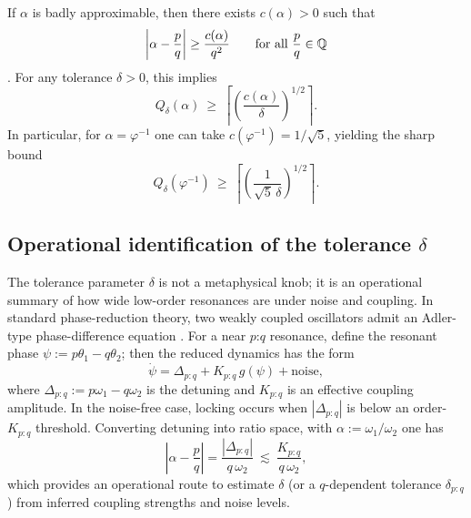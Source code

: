 \begin{proposition}
\label{prop:Qdelta_bound}
If $\alpha$ is badly approximable, then there exists $c(\alpha)>0$ such that
\begin{equation}
  \left|\alpha-\frac{p}{q}\right| \ge \frac{c(\alpha)}{q^2}
  \qquad\text{for all } \frac{p}{q}\in\mathbb{Q}
  \label{eq:diophantine_bound}
\end{equation}
\cite{Cassels1957}. For any tolerance $\delta>0$, this implies
\begin{equation}
  Q_\delta(\alpha)\ \ge\ \left\lceil \left(\frac{c(\alpha)}{\delta}\right)^{1/2}\right\rceil.
  \label{eq:Qdelta_lower}
\end{equation}
In particular, for $\alpha=\varphi^{-1}$ one can take $c(\varphi^{-1})=1/\sqrt{5}$, yielding the sharp bound
\begin{equation}
  Q_\delta(\varphi^{-1})\ \ge\ \left\lceil \left(\frac{1}{\sqrt{5}\,\delta}\right)^{1/2}\right\rceil.
  \label{eq:Qdelta_golden}
\end{equation}
\end{proposition}

\subsection{Operational identification of the tolerance \texorpdfstring{$\delta$}{delta}}
\label{sec:delta_identification}

The tolerance parameter $\delta$ is not a metaphysical knob; it is an operational summary of how wide low-order resonances are under noise and coupling.
In standard phase-reduction theory, two weakly coupled oscillators admit an Adler-type phase-difference equation \cite{Strogatz1994,PikovskyRosenblumKurths2001}.
For a near $p$:$q$ resonance, define the resonant phase $\psi := p\theta_1-q\theta_2$; then the reduced dynamics has the form
\begin{equation}
  \dot\psi = \Delta_{p:q} + K_{p:q}\,g(\psi) + \text{noise},
\end{equation}
where $\Delta_{p:q}:=p\omega_1-q\omega_2$ is the detuning and $K_{p:q}$ is an effective coupling amplitude.
In the noise-free case, locking occurs when $|\Delta_{p:q}|$ is below an order-$K_{p:q}$ threshold.
Converting detuning into ratio space, with $\alpha:=\omega_1/\omega_2$ one has
\begin{equation}
  \left|\alpha-\frac{p}{q}\right|
  = \frac{|\Delta_{p:q}|}{q\,\omega_2}
  \ \lesssim\ \frac{K_{p:q}}{q\,\omega_2},
  \label{eq:delta_from_detuning}
\end{equation}
which provides an operational route to estimate $\delta$ (or a $q$-dependent tolerance $\delta_{p:q}$) from inferred coupling strengths and noise levels.

